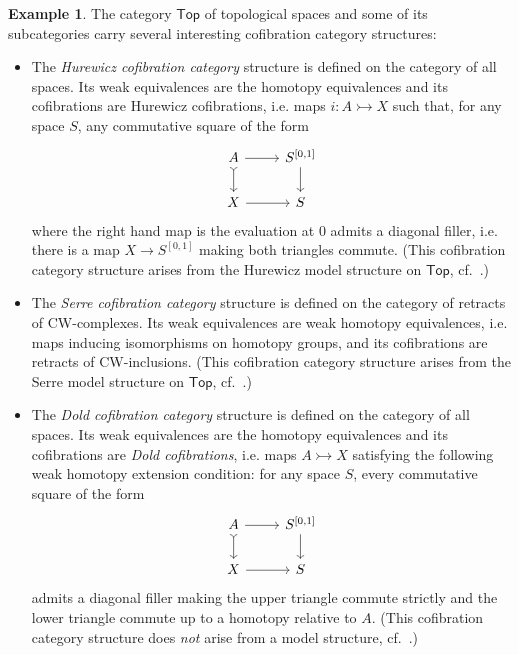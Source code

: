 \documentclass[11pt]{article}
\theoremstyle{definition}
\newtheorem{example}[theo]{Example}
\numberwithin{equation}{section}
\newcommand{\Top}{\mathsf{Top}}
\newcommand{\cto}{\rightarrowtail}
\newcommand{\from}{\colon}
\begin{document}
\begin{example} \label{ex:top-cofib-cat}
  The category $\Top$ of topological spaces and some of its subcategories carry several interesting cofibration category structures:
  \begin{itemize}
      \item The \emph{Hurewicz cofibration category} structure is defined on the category of all spaces.
      Its weak equivalences are the homotopy equivalences and its cofibrations are Hurewicz cofibrations, i.e. maps $i \from A \cto X$ such that, for any space $S$, any commutative square of the form
      \[ \begin{tikzcd}
        A \arrow[r] \arrow[d,tail] & S^{[0,1]} \arrow[d] \\
        X \arrow[r] & S
      \end{tikzcd} \]
      where the right hand map is the evaluation at $0$ admits a diagonal filler, i.e. there is a map $X \to S^{[0,1]}$ making both triangles commute.
      (This cofibration category structure arises from the Hurewicz model structure on $\Top$, cf.~\cite[Thm.~3]{strom}.)
      \item The \emph{Serre cofibration category} structure is defined on the category of retracts of CW-complexes.
      Its weak equivalences are weak homotopy equivalences, i.e. maps inducing isomorphisms on homotopy groups, and its cofibrations are retracts of CW-inclusions.
      (This cofibration category structure arises from the Serre model structure on $\Top$, cf.~\cite[Thm.~2.4.19]{hovey:book}.)
      \item The \emph{Dold cofibration category} structure is defined on the category of all spaces.
      Its weak equivalences are the homotopy equivalences and its cofibrations are \emph{Dold cofibrations}, i.e. maps $A \cto X$ satisfying the following weak homotopy extension condition: for any space $S$, every commutative square of the form
      \[ \begin{tikzcd}
        A \arrow[r] \arrow[d,tail] & S^{[0,1]} \arrow[d] \\
        X \arrow[r] & S
      \end{tikzcd} \]
      admits a diagonal filler making the upper triangle commute strictly and the lower triangle commute up to a homotopy relative to $A$.
      (This cofibration category structure does {\em not} arise from a model structure, cf.~\cite[Thm.~1.32.(2)]{szumilo:two-models}.)
  \end{itemize}
\end{example}
\end{document}
